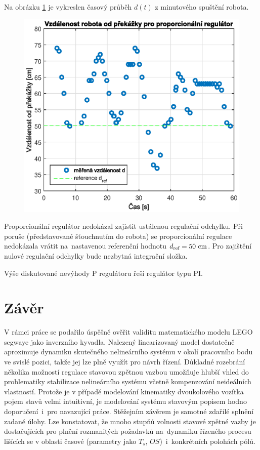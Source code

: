 \documentclass[conference]{IEEEtran}
\begin{document}
Na obrázku \ref{fig:vzdalenost_P} je vykreslen časový průběh $d(t)$ z minutového spuštění robota.
\begin{figure}[htbp]
    \centerline{\includegraphics[width=\linewidth]{vzdalenost_od_prekazky_proporcionalni.eps}}
    \caption{}
    \label{fig:vzdalenost_P}        
\end{figure}
Proporcionální regulátor nedokázal zajistit ustálenou regulační odchylku. Při poruše (představované šťouchnutím do robota)
se proporcionální regulace nedokázala vrátit na~nastavenou referenční hodnotu $d_\text{ref} = 50~\text{\si{\centi\metre}}$.
Pro zajištění nulové regulační odchylky bude nezbytná integrační složka.


Výše diskutované nevýhody P regulátoru řeší regulátor typu PI.  

\section{Závěr}
V rámci práce se podařilo úspěšně ověřit validitu matematického modelu LEGO segwaye jako inverzního kyvadla.
Nalezený linearizovaný model dostatečně aproximuje dynamiku skutečného nelineárního systému v okolí pracovního bodu ve svislé pozici,
takže jej lze plně využít pro návrh řízení. Důkladné rozebrání několika možností regulace stavovou zpětnou vazbou umožňuje
hlubší vhled do problematiky stabilizace nelineárního systému včetně kompenzování neideálních vlastností.
Protože je v případě modelování kinematiky dvoukolového vozítka pojem stavů velmi intuitivní, je modelování systému stavovým popisem
hodno doporučení~i~pro navazující práce.  Stěžejním závěrem je samotné zdařilé splnění zadané úlohy.
Lze konstatovat, že mnoho stupňů volnosti stavové zpětné vazby je dostačujících pro plnění rozmanitých požadavků na~dynamiku řízeného procesu
lišících se v oblasti časové (parametry jako $T_s$, $OS$)~i~konkrétních polohách pólů.
\end{document}
